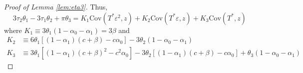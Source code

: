 \begin{proof}[Proof of Lemma \ref{lem:eta3}]
Thus, 
\[
  3\tau_2 \theta_1 - 3 \tau_1 \theta_2 + \pi \theta_3 = K_1 \mbox{Cov}(T^*\varepsilon^2,z) + K_2 \mbox{Cov}(T^*\varepsilon, z) + K_3 \mbox{Cov}(T^*,z)
\]
where $K_1 \equiv 3 \theta_1(1 - \alpha_0 - \alpha_1) = 3 \beta$ and
\begin{align*}
  K_2 &\equiv 6\theta_1 \left[(1 - \alpha_1)(c +\beta) - c\alpha_0\right] - 3\theta_2 (1 - \alpha_0 - \alpha_1) \\
  K_3 &\equiv 3\theta_1 \left[ (1 - \alpha_1)(c + \beta)^2 - c^2 \alpha_0 \right] - 3\theta_2 \left[ (1 - \alpha_1)(c + \beta) - c\alpha_0 \right] + \theta_3(1 - \alpha_0 - \alpha_1)

\end{align*}
\end{proof}
